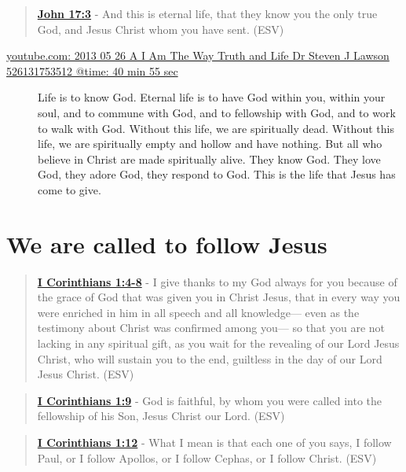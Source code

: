 \documentclass[11pt]{article}
\begin{document}
\begin{quote}
\textbf{\href{https://www.biblegateway.com/passage/?search=John\%2017\%3A3\&version=ESV}{John 17:3}} - And this is eternal life, that they know you the only true God, and Jesus Christ whom you have sent. (ESV)
\end{quote}

\begin{description}
\item[{\href{https://youtube.com/watch?v=-33jh183A1s\&t=2455}{youtube.com: 2013 05 26 A I Am The Way  Truth and Life   Dr  Steven J  Lawson   526131753512 @time: 40 min 55 sec}}] Life is to know God. Eternal life is to
have God within you, within your soul, and
to commune with God, and to fellowship with
God, and to work to walk with God. Without
this life, we are spiritually dead.
Without this life, we are spiritually
empty and hollow and have nothing.
But all who believe in Christ are made
spiritually alive. They know God.
They love God, they adore God, they respond to
God. This is the life that Jesus has come
to give.
\end{description}

\section{We are called to follow Jesus}
\label{sec:orgec7bb2b}
\begin{quote}
\textbf{\href{https://www.biblegateway.com/passage/?search=1\%20Corinthians\%201\%3A4-8\&version=ESV}{I Corinthians 1:4-8}} - I give thanks to my God always for you because of the grace of God that was given you in Christ Jesus, that in every way you were enriched in him in all speech and all knowledge— even as the testimony about Christ was confirmed among you— so that you are not lacking in any spiritual gift, as you wait for the revealing of our Lord Jesus Christ, who will sustain you to the end, guiltless in the day of our Lord Jesus Christ. (ESV)
\end{quote}

\begin{quote}
\textbf{\href{https://www.biblegateway.com/passage/?search=1\%20Corinthians\%201\%3A9\&version=ESV}{I Corinthians 1:9}} - God is faithful, by whom you were called into the fellowship of his Son, Jesus Christ our Lord. (ESV)
\end{quote}

\begin{quote}
\textbf{\href{https://www.biblegateway.com/passage/?search=1\%20Corinthians\%201\%3A12\&version=ESV}{I Corinthians 1:12}} - What I mean is that each one of you says, I follow Paul, or I follow Apollos, or I follow Cephas, or I follow Christ. (ESV)
\end{quote}
\end{document}
